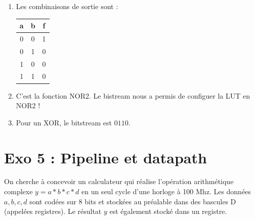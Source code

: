 \documentclass[a4paper,11pt]{article}
\begin{document}
\begin{enumerate}
  \item Les combinaisons de sortie sont :
  \begin{tabular}{|c|c||c|}
    \hline
    a & b & f \\ \hline \hline
    0 & 0 & 1 \\ \hline
    0 & 1 & 0 \\ \hline
    1 & 0 & 0 \\ \hline
    1 & 1 & 0 \\ \hline
  \end{tabular}
  \item C'est la fonction NOR2. Le bistream nous a permis de configuer la LUT en NOR2 !

  \item Pour un XOR, le bitstream est $0110$.
\end{enumerate}

\newpage
\section{Exo 5 : Pipeline et datapath}

On cherche à concevoir un calculateur qui réalise l'opération arithmétique complexe $y=a*b*c*d$ en un seul cycle d'une horloge à 100 Mhz. Les données $a,b,c,d$ sont codées sur 8 bits et stockées
au préalable dans des bascules D (appelées registres). Le résultat $y$ est également stocké dans un registre.
\end{document}
